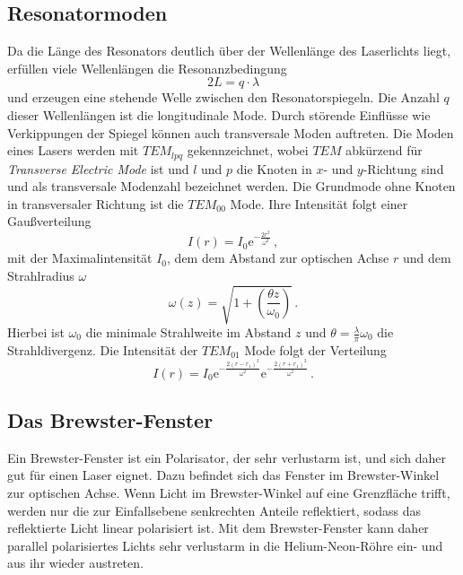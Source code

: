 \subsection*{Resonatormoden}
Da die Länge des Resonators deutlich über der Wellenlänge des Laserlichts liegt, erfüllen viele Wellenlängen die 
Resonanzbedingung 
\begin{equation*}
    2 L = q \cdot \lambda 
\end{equation*}
und erzeugen eine stehende Welle zwischen den Resonatorspiegeln. Die Anzahl $q$ dieser Wellenlängen ist die longitudinale
Mode. Durch störende Einflüsse wie Verkippungen der Spiegel können auch transversale Moden auftreten.
Die Moden eines Lasers werden mit $TEM_{lpq}$ gekennzeichnet, wobei $TEM$ abkürzend für \textit{Transverse Electric Mode} ist
und $l$ und $p$ die Knoten in $x$- und $y$-Richtung sind und als transversale Modenzahl bezeichnet werden.
Die Grundmode ohne Knoten in transversaler Richtung ist die $TEM_{00}$ Mode. Ihre Intensität folgt einer
Gaußverteilung
\begin{equation*}
    I \left(r\right) = I_0 \text{e}^{-\frac{2 r^2}{\omega^2}} \, ,
\end{equation*}
mit der Maximalintensität $I_0$, dem dem Abstand zur optischen Achse $r$ und dem Strahlradius $\omega$
\begin{equation*}
    \omega \left(z\right) = \sqrt{1 + \left(\frac{\theta z}{\omega_0}\right)} \, .
\end{equation*}
Hierbei ist $\omega_0$ die minimale Strahlweite im Abstand $z$ und $\theta = \frac{\lambda}{\pi} \omega_0$ die Strahldivergenz.
Die Intensität der $TEM_{01}$ Mode folgt der Verteilung
\begin{equation*}
    I \left(r\right) = I_0 \text{e}^{- \frac{2 \left(r - r_1\right)^2}{\omega^2}} \text{e}^{- \frac{2 \left(r + r_1\right)^2}{\omega^2}} \, .
\end{equation*}

\subsection*{Das Brewster-Fenster}
Ein Brewster-Fenster ist ein Polarisator, der sehr verlustarm ist, und sich daher gut für einen Laser eignet.
Dazu befindet sich das Fenster im Brewster-Winkel zur optischen Achse. Wenn Licht im Brewster-Winkel auf eine Grenzfläche
trifft, werden nur die zur Einfallsebene senkrechten Anteile reflektiert, sodass das reflektierte Licht linear polarisiert 
ist. Mit dem Brewster-Fenster kann daher parallel polarisiertes Lichts sehr verlustarm in die Helium-Neon-Röhre ein- und aus ihr wieder austreten.

